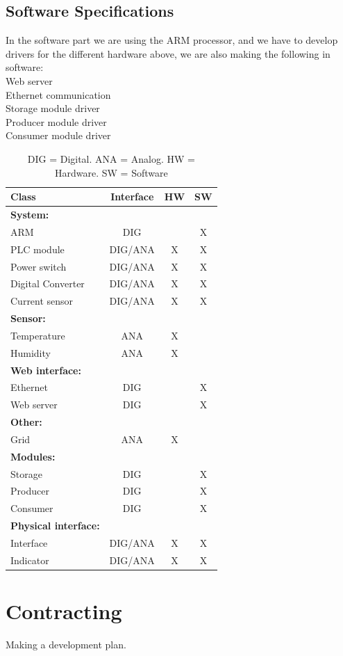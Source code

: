 \subsection{Software Specifications}
In the software part we are using the ARM processor, and we have to develop drivers for the different hardware above, we are also making the following in software:
\\Web server
\\Ethernet communication
\\Storage module driver
\\Producer module driver
\\Consumer module driver
\begin{table}[H]
	\begin{tabular}{| l | c | c | c |}
	\hline
		Class						& Interface	& HW	& SW	\\ \hline
		\textbf{System:}					&			&		&		\\ \hline
		ARM							& DIG		&		& X 		\\ \hline
		PLC module					& DIG/ANA	& X		& X 		\\ \hline
		Power switch					& DIG/ANA	& X		& X 		\\ \hline
		Digital Converter				& DIG/ANA	& X		& X 		\\ \hline
		Current sensor					& DIG/ANA	& X		& X 		\\ \hline
		\textbf{Sensor:}					&			&		&		\\ \hline
		Temperature					& ANA		& X		& 	 	\\ \hline
		Humidity						& ANA		& X		& 		\\ \hline
		\textbf{Web interface:}			&			&		&		\\ \hline
		Ethernet						& DIG		& 		& X	 	\\ \hline
		Web server					& DIG		& 		& X		\\ \hline
		\textbf{Other:}					&			&		&		\\ \hline
		Grid							& ANA		& X		& 	 	\\ \hline
		\textbf{Modules:}				&			&		&		\\ \hline
		Storage						& DIG		& 		& X	 	\\ \hline
		Producer						& DIG		& 		& X		\\ \hline
		Consumer					& DIG		& 		& X		\\ \hline
		\textbf{Physical interface:}			&			&		&		\\ \hline
		Interface						& DIG/ANA	& X		& X	 	\\ \hline
		Indicator						& DIG/ANA	& X		& X		\\ \hline
	\end{tabular}
	\caption{DIG = Digital. ANA = Analog. HW = Hardware. SW = Software}
\end{table}

\section{Contracting}
{\Huge Making a development plan.}